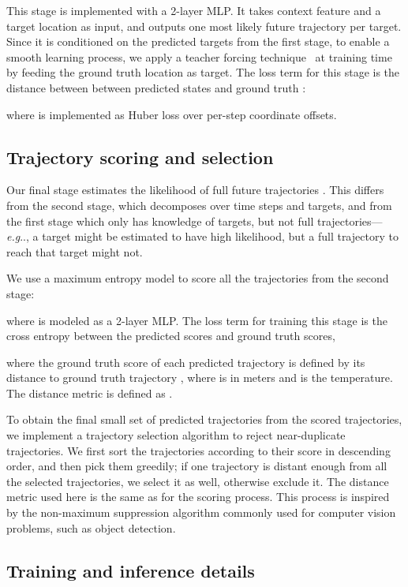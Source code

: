 \documentclass{article}
\makeatletter
\DeclareRobustCommand\onedot{\futurelet\@let@token\@onedot}
\def\@onedot{\ifx\@let@token.\else.\null\fi\xspace}
\def\eg{\emph{e.g}\onedot} \def\Eg{\emph{E.g}\onedot}
\makeatother
\begin{document}
This stage is implemented with a 2-layer MLP. It takes context feature  and a target location  as input,
and outputs one most likely future trajectory  per target. Since it is conditioned on the predicted targets from the first stage, to enable a smooth learning process, we apply a teacher forcing technique~\cite{williams1989learning} at training time by feeding the ground truth location  as target. The loss term for this stage is the distance between between predicted states  and ground truth :

where  is implemented as Huber loss over per-step coordinate offsets.


\subsection{Trajectory scoring and selection}
\label{sec:stage3}
Our final stage estimates the likelihood of full future trajectories .  This differs from the second stage, which decomposes over time steps and targets, and from the first stage which only has knowledge of targets, but not full trajectories---\eg, a target might be estimated to have high likelihood, but a full trajectory to reach that target might not.

We use a maximum entropy model to score all the  trajectories from the second stage:

where  is modeled as a 2-layer MLP. 
The loss term for training this stage is the cross entropy between the predicted scores and ground truth scores,

where the ground truth score of each predicted trajectory is defined by its distance to ground truth trajectory , where  is in meters and  is the temperature.  The distance metric is defined as . 

To obtain the final small set of  predicted trajectories from the scored  trajectories, we implement  a trajectory selection algorithm to reject near-duplicate trajectories. We first sort the trajectories according to their score in  descending order, and then pick them greedily; if one trajectory is distant enough from all the selected trajectories, we select it as well, otherwise exclude it. The distance metric used here is the same as for the scoring process.
This process is inspired by the non-maximum suppression algorithm commonly used for computer vision problems, such as
object detection. 


\subsection{Training and inference details}
\end{document}
